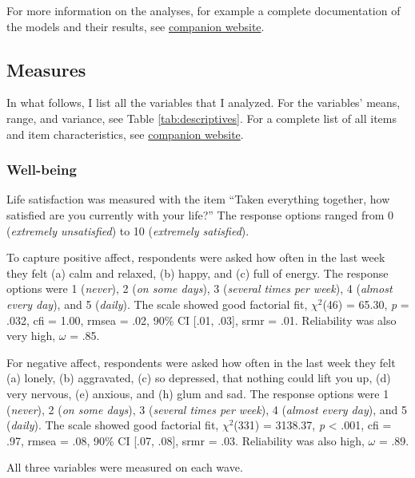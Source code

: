 \documentclass[
  english,
  man,mask,floatsintext]{apa6}
\begin{document}
For more information on the analyses, for example a complete documentation of the models and their results, see \href{https://xmtra.github.io/Austrian_Corona_Panel_Project/index.html}{companion website}.

\hypertarget{measures}{%
\subsection{Measures}\label{measures}}

In what follows, I list all the variables that I analyzed.
For the variables' means, range, and variance, see Table \ref{tab:descriptives}.
For a complete list of all items and item characteristics, see \href{https://xmtra.github.io/Austrian_Corona_Panel_Project/index.html}{companion website}.

\hypertarget{well-being}{%
\subsubsection{Well-being}\label{well-being}}

Life satisfaction was measured with the item ``Taken everything together, how satisfied are you currently with your life?''
The response options ranged from 0 (\emph{extremely unsatisfied}) to 10 (\emph{extremely satisfied}).

To capture positive affect, respondents were asked how often in the last week they felt (a) calm and relaxed, (b) happy, and (c) full of energy.
The response options were 1 (\emph{never}), 2 (\emph{on some days}), 3 (\emph{several times per week}), 4 (\emph{almost every day}), and 5 (\emph{daily}).
The scale showed good factorial fit, \(\chi^2\)(46) = 65.30, \textit{p} = .032, cfi = 1.00, rmsea = .02, 90\% CI {[}.01, .03{]}, srmr = .01.
Reliability was also very high, \(\omega\) = .85.

For negative affect, respondents were asked how often in the last week they felt (a) lonely, (b) aggravated, (c) so depressed, that nothing could lift you up, (d) very nervous, (e) anxious, and (h) glum and sad.
The response options were 1 (\emph{never}), 2 (\emph{on some days}), 3 (\emph{several times per week}), 4 (\emph{almost every day}), and 5 (\emph{daily}).
The scale showed good factorial fit, \(\chi^2\)(331) = 3138.37, \textit{p} \textless{} .001, cfi = .97, rmsea = .08, 90\% CI {[}.07, .08{]}, srmr = .03.
Reliability was also high, \(\omega\) = .89.

All three variables were measured on each wave.
\end{document}

